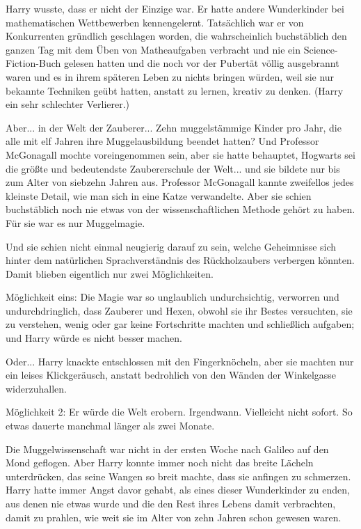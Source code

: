 Harry wusste, dass er nicht der Einzige war. Er hatte andere Wunderkinder bei
mathematischen Wettbewerben kennengelernt. Tatsächlich war er von
Konkurrenten gründlich geschlagen worden, die wahrscheinlich buchstäblich
den ganzen Tag mit dem Üben von Matheaufgaben verbracht und nie ein
Science-Fiction-Buch gelesen hatten und die noch vor der Pubertät völlig
ausgebrannt waren und es in ihrem späteren Leben zu nichts bringen würden,
weil sie nur bekannte Techniken geübt hatten, anstatt zu lernen, kreativ zu
denken. (Harry ein sehr schlechter Verlierer.)

Aber... in der Welt der Zauberer... Zehn muggelstämmige Kinder pro Jahr, die
alle mit elf Jahren ihre Muggelausbildung beendet hatten? Und Professor
McGonagall mochte voreingenommen sein, aber sie hatte behauptet, Hogwarts
sei die größte und bedeutendste Zaubererschule der Welt... und sie bildete
nur bis zum Alter von siebzehn Jahren aus. Professor McGonagall kannte
zweifellos jedes kleinste Detail, wie man sich in eine Katze verwandelte.
Aber sie schien buchstäblich noch nie etwas von der wissenschaftlichen
Methode gehört zu haben. Für sie war es nur Muggelmagie.

Und sie schien nicht einmal neugierig darauf zu sein, welche Geheimnisse sich
hinter dem natürlichen Sprachverständnis des Rückholzaubers verbergen
könnten. Damit blieben eigentlich nur zwei Möglichkeiten.

Möglichkeit eins: Die Magie war so unglaublich undurchsichtig, verworren und
undurchdringlich, dass Zauberer und Hexen, obwohl sie ihr Bestes versuchten,
sie zu verstehen, wenig oder gar keine Fortschritte machten und schließlich
aufgaben; und Harry würde es nicht besser machen.

Oder... Harry knackte entschlossen mit den Fingerknöcheln, aber sie machten nur
ein leises Klickgeräusch, anstatt bedrohlich von den Wänden der Winkelgasse
widerzuhallen.

Möglichkeit 2: Er würde die Welt erobern. Irgendwann. Vielleicht nicht sofort.
So etwas dauerte manchmal länger als zwei Monate.

Die Muggelwissenschaft war nicht in der ersten Woche nach Galileo auf den Mond
geflogen. Aber Harry konnte immer noch nicht das breite Lächeln
unterdrücken, das seine Wangen so breit machte, dass sie anfingen zu
schmerzen. Harry hatte immer Angst davor gehabt, als eines dieser
Wunderkinder zu enden, aus denen nie etwas wurde und die den Rest ihres
Lebens damit verbrachten, damit zu prahlen, wie weit sie im Alter von zehn
Jahren schon gewesen waren.

